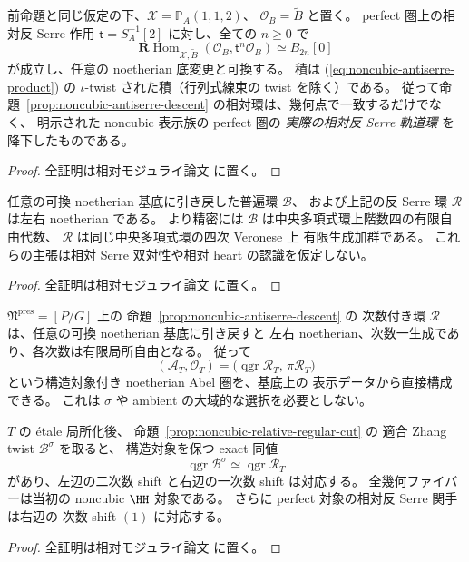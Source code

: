 \begin{corollary}
\label{cor:noncubic-relative-orbit-hom}
前命題と同じ仮定の下、$\mathcal X=\mathbb P_A(1,1,2)$、
$\mathcal O_B=\widetilde B$ と置く。
perfect 圏上の相対反 Serre 作用
$\mathsf t=S_A^{-1}[2]$ に対し、全ての $n\ge0$ で
\[
 \mathbf R\operatorname{Hom}_{\mathcal X,\widetilde B}
    (\mathcal O_B,\mathsf t^n\mathcal O_B)
       \simeq B_{2n}[0]
 \tag{NC-orbit}\label{eq:noncubic-relative-orbit-hom}
\]
が成立し、任意の noetherian 底変更と可換する。
積は (\ref{eq:noncubic-antiserre-product}) の
$\iota$-twist された積（行列式線束の twist を除く）である。
従って命題~\ref{prop:noncubic-antiserre-descent}
の相対環は、幾何点で一致するだけでなく、
明示された noncubic 表示族の perfect 圏の
\emph{実際の相対反 Serre 軌道環} を降下したものである。
\end{corollary}
\begin{proof}
全証明は相対モジュライ論文 \cite[\texttt{noncubic_stack}]{QuadricModuli2026} に置く。
\end{proof}

\begin{proposition}
\label{prop:noncubic-relative-noetherian}
任意の可換 noetherian 基底に引き戻した普遍環 $\mathcal B$、
および上記の反 Serre 環 $\mathcal R$ は左右 noetherian である。
より精密には $\mathcal B$ は中央多項式環上階数四の有限自由代数、
$\mathcal R$ は同じ中央多項式環の四次 Veronese 上
有限生成加群である。
これらの主張は相対 Serre 双対性や相対 heart の認識を仮定しない。
\end{proposition}
\begin{proof}
全証明は相対モジュライ論文 \cite[\texttt{noncubic_stack}]{QuadricModuli2026} に置く。
\end{proof}

\begin{proposition}
\label{prop:noncubic-relative-heart-veronese}
$\mathfrak N^{\mathrm{pres}}=[P/G]$ 上の
命題~\ref{prop:noncubic-antiserre-descent} の
次数付き環 $\mathcal R$ は、任意の可換 noetherian 基底に引き戻すと
左右 noetherian、次数一生成であり、各次数は有限局所自由となる。
従って
\[
  (\mathcal A_T,\mathcal O_T)
  =\bigl(\operatorname{qgr}\mathcal R_T,\,
          \pi\mathcal R_T\bigr)
  \tag{NC-heart}\label{eq:noncubic-relative-heart}
\]
という構造対象付き noetherian Abel 圏を、基底上の
表示データから直接構成できる。
これは $\sigma$ や ambient の大域的な選択を必要としない。

$T$ の \'etale 局所化後、
命題~\ref{prop:noncubic-relative-regular-cut} の
適合 Zhang twist $\mathcal B^\sigma$ を取ると、
構造対象を保つ exact 同値
\[
 \operatorname{qgr}\mathcal B^\sigma
       \simeq\operatorname{qgr}\mathcal R_T
\]
があり、左辺の二次数 shift と右辺の一次数 shift は対応する。
全幾何ファイバーは当初の noncubic $\HH$ 対象である。
さらに perfect 対象の相対反 Serre 関手は右辺の
次数 shift $(1)$ に対応する。
\end{proposition}
\begin{proof}
全証明は相対モジュライ論文 \cite[\texttt{noncubic_stack}]{QuadricModuli2026} に置く。
\end{proof}

